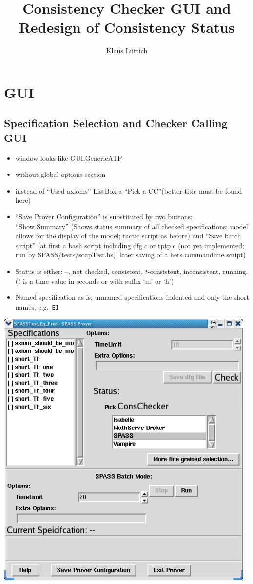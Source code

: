 \documentclass[a4paper,10pt]{article}
\title{Consistency Checker GUI and Redesign of Consistency Status}
\author{Klaus L\"uttich}
\begin{document}
\maketitle
\section{GUI}
\subsection{Specification Selection and Checker Calling GUI}

\begin{itemize}
\item window looks like GUI.GenericATP 
\item without global options section
\item instead of ``Used axioms'' ListBox a ``Pick a CC''(better title
  must be found here)
\item ``Save Prover Configuration'' is substituted by two buttons:\\
  ``Show Summary'' (Shows status summary of all checked
  specifications; \underline{model} allows for the display of the
  model; \underline{tactic script} as before) and ``Save batch
  script'' (at first a bash script including dfg.c or tptp.c (not yet
  implemented; run by SPASS/tests/soapTest.hs), later saving of a hets
  commandline script)
\item Status is either: --, not checked, consistent, $t$-consistent,
  inconsistent, running. ($t$ is a time value in seconds or with
  suffix `m' or `h')
\item Named specification as is; unnamed specifications indented and
  only the short names, e.g.\ \verb,E1,
\end{itemize}

\includegraphics[width=13cm]{ConscheckerGUI}
\end{document}
